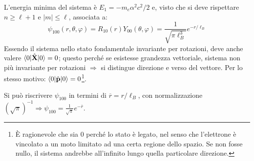 \documentclass[10pt, a4paper]{scrartcl} %
\numberwithin{equation}{subsection}
\theoremstyle{style2}
\theoremstyle{style1}
\begin{document}
L'energia minima del sistema \`e $E_1 = - m_e \alpha ^2 c^2 / 2$ e, visto che si deve rispettare $n\ge \ell +1$ e $\lvert m \rvert \le  \ell $, associata a:
\begin{equation}
	\psi _{100} (r,\theta ,\varphi ) = R_{10} (r) Y_{00} (\theta ,\varphi ) = \frac{1}{\sqrt{\pi \ell _B^3} } e^{- r / \ell _B} 
\end{equation}
Essendo il sistema nello stato fondamentale invariante per rotazioni, deve anche valere $\braket{0|\hat{\mathbf{X} }|0} = 0$; questo perch\'e se esistesse grandezza vettoriale, sistema non pi\`u invariante per rotazioni $\Rightarrow $ si distingue direzione e verso del vettore. Per lo stesso motivo: $\braket{0|\hat{\mathbf{p} }|0}  =0$\footnote{\`E ragionevole che sia $0$ perch\'e lo stato \`e legato, nel senso che l'elettrone \`e vincolato a un moto limitato ad una certa regione dello spazio. Se non fosse nullo, il sistema andrebbe all'infinito lungo quella particolare direzione.}.

Si pu\`o riscrivere $\psi _{100} $ in termini di $\overline{r} = r / \ell _B$, con normalizzazione $(\sqrt{\pi} )^{-1} \Rightarrow \psi _{100} = \frac{1}{\sqrt{\pi} }e^{ - \overline{r}} $. 
\end{document}
